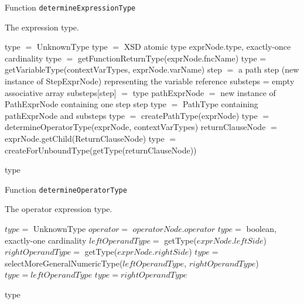 \begin{algorithm}
\caption{Function \texttt{determineExpressionType}}
\label{ALG_func_determineExpressionType}
\begin{algorithmic}[1]
\ENSURE The expression type.

\STATE type $=$ UnknownType
     \STATE type $=$ XSD atomic type exprNode.type, exactly-once cardinality
     \STATE type $=$ getFunctionReturnType(exprNode.fncName)
     \STATE type = getVariableType(contextVarTypes, exprNode.varName)
         \STATE step $=$ a path step (new instance of StepExprNode) representing the variable reference
		 \STATE substeps = empty associative array         
         \STATE substeps[step] $=$ type
         \STATE pathExprNode $=$ new instance of PathExprNode containing one step step
         \STATE type $=$ PathType containing pathExprNode and substeps
     \ENDIF
{}
     \STATE type $=$ createPathType(exprNode)
     \STATE type $=$ determineOperatorType(exprNode, contextVarTypes)
     \STATE returnClauseNode $=$ exprNode.getChild(ReturnClauseNode)
     \STATE type $=$ createForUnboundType(getType(returnClauseNode))
\ENDIF

\RETURN type
\end{algorithmic}
\end{algorithm}

\begin{algorithm}
\caption{Function \texttt{determineOperatorType}}
\label{ALG_func_determineOperatorType}
\begin{algorithmic}[1]
\ENSURE The operator expression type.

\STATE $type =$ UnknownType
\STATE $operator =$ $operatorNode.operator$
    \STATE $type =$ boolean, exactly-one cardinality
    \STATE $leftOperandType =$ getType($exprNode.leftSide$)
    \STATE $rightOperandType =$ getType($exprNode.rightSide$)
        \STATE $type =$ selectMoreGeneralNumericType($leftOperandType$, $rightOperandType$)
        \STATE $type = leftOperandType$
        \STATE $type = rightOperandType$
    \ENDIF
\ENDIF

\RETURN type
\end{algorithmic}
\end{algorithm}

